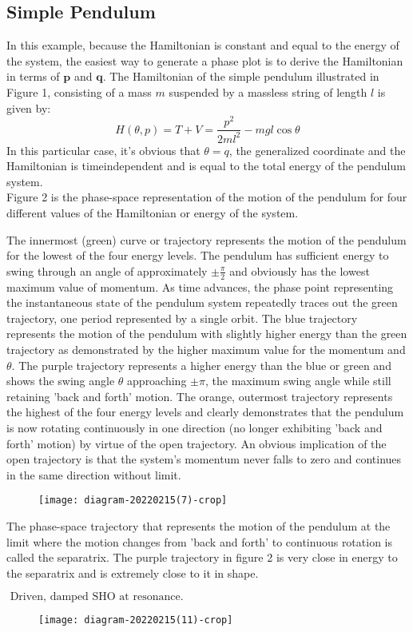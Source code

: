 \subsection{ Simple Pendulum}
In this example, because the Hamiltonian is constant and equal to the energy of the system, the easiest way to generate a phase plot is to derive the Hamiltonian in terms of $\boldsymbol{p}$ and $\boldsymbol{q}$. The Hamiltonian of the simple pendulum illustrated in Figure 1, consisting of a mass $m$ suspended by a massless string of length $l$ is given by:
$$
H(\theta, p)=T+V=\frac{p^{2}}{2 m l^{2}}-m g l \cos \theta
$$
In this particular case, it's obvious that $\theta=q$, the generalized coordinate and the Hamiltonian is timeindependent and is equal to the total energy of the pendulum system.\\
Figure 2 is the phase-space representation of the motion of the pendulum for four different values of the Hamiltonian or energy of the system.\\
\par The innermost (green) curve or trajectory represents the motion of the pendulum for the lowest of the four energy levels. The pendulum has sufficient energy to swing through an angle of approximately $\pm \frac{\pi}{2}$ and obviously has the lowest maximum value of momentum. As time advances, the phase point representing the instantaneous state of the pendulum system repeatedly traces out the green trajectory, one period represented by a single orbit.
The blue trajectory represents the motion of the pendulum with slightly higher energy than the green trajectory as demonstrated by the higher maximum value for the momentum and $\theta$.
The purple trajectory represents a higher energy than the blue or green and shows the swing angle $\theta$ approaching $\pm \pi$, the maximum swing angle while still retaining 'back and forth' motion.
The orange, outermost trajectory represents the highest of the four energy levels and clearly demonstrates that the pendulum is now rotating continuously in one direction (no longer exhibiting 'back and forth' motion) by virtue of the open trajectory. An obvious implication of the open trajectory is that the system's momentum never falls to zero and continues in the same direction without limit.\\
\begin{figure}[H]
	\centering
	\texttt{[image: diagram-20220215(7)-crop]}
	\caption{}
	\label{}
\end{figure}
The phase-space trajectory that represents the motion of the pendulum at the limit where the motion changes from 'back and forth' to continuous rotation is called the separatrix. The purple trajectory in figure 2 is very close in energy to the separatrix and is extremely close to it in shape.\\
\begin{note}
	$\text { Driven, damped SHO at resonance. }$\\
	\begin{figure}[H]
		\centering
		\texttt{[image: diagram-20220215(11)-crop]}
		\caption{}
		\label{}
	\end{figure}
\end{note}



